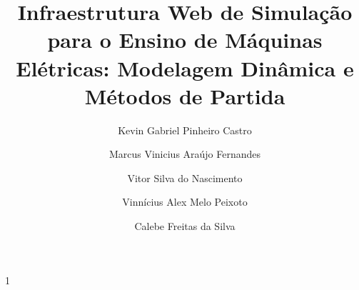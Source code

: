 \documentclass[a4paper]{ifacconf}
\def\portugues{1}
\def\portugues{0}
\begin{document}
	
	
\if\portugues1

% 
	
\begin{frontmatter}
\vspace*{-2cm}
\title{Infraestrutura Web de Simulação para o Ensino de Máquinas Elétricas: Modelagem Dinâmica e Métodos de Partida} 


\author[First]{Kevin Gabriel Pinheiro Castro} 
\author[First]{Marcus Vinicius Araújo Fernandes} 
\author[First]{Vitor Silva do Nascimento}
\author[First]{Vinnícius Alex Melo Peixoto}
\author[First]{Calebe Freitas da Silva}


\end{frontmatter}
\end{document}

